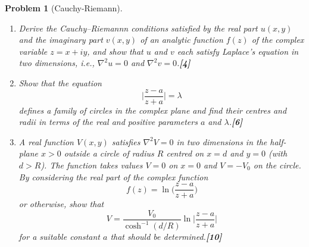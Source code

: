 \documentclass[a4paper]{article}
\theoremstyle{new}
\newtheorem{qns}{Problem}[section]
\begin{document}
\newpage
\begin{qns}[Cauchy-Riemann]\leavevmode
\begin{enumerate}[label=(\roman*)]
\item Derive the Cauchy–Riemannn conditions satisfied by the real part $u(x, y)$ and the imaginary part $v(x, y)$ of an analytic function $f(z)$ of the complex variable $z = x+iy$, and show that $u$ and $v$ each satisfy Laplace’s equation in two dimensions, i.e., $\nabla^2u = 0$ and $\nabla^2v = 0$.\hfill \textbf{[4]}
\item Show that the equation
$$\bigg|\frac{z-a}{z+a}\bigg|=\lambda$$
defines a family of circles in the complex plane and find their centres and radii in terms of the real and positive parameters $a$ and $\lambda$.\hfill \textbf{[6]}
\item A real function $V (x, y)$ satisfies $\nabla^2V=0$ in two dimensions in the half-plane $x > 0$ outside a circle of radius $R$ centred on $x = d$ and $y = 0$ (with $d > R$). The function
takes values $V = 0$ on $x = 0$ and $V = −V_0$ on the circle. By considering the real part of the complex function
$$f(z)=\ln\bigg(\frac{z-a}{z+a}\bigg)$$
or otherwise, show that
$$V=\frac{V_0}{\cosh^{-1}(d/R)}\ln\bigg|\frac{z-a}{z+a}\bigg|$$
for a suitable constant $a$ that should be determined.\hfill \textbf{[10]}
\end{enumerate}
\end{qns}
\end{document}
